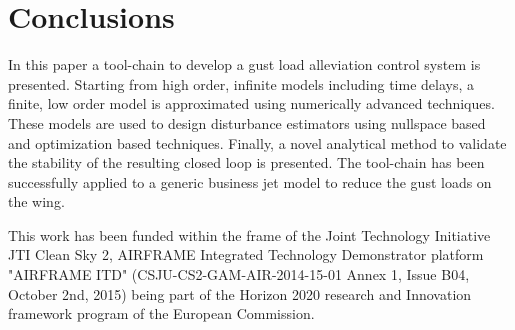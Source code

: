 \documentclass[graybox]{svmult}
\begin{document}
\section{Conclusions}
In this paper a tool-chain to develop a gust load alleviation control system is presented. Starting from high order, infinite models including time delays, a finite, low order model is approximated using numerically advanced techniques. These models are used to design  disturbance estimators using nullspace based and optimization based techniques. Finally, a novel analytical method to validate the stability of the resulting closed loop is presented. The tool-chain has been successfully applied to a generic business jet model to reduce the gust loads on the wing. 

\begin{acknowledgement}
This work has been funded within the frame of the Joint Technology Initiative JTI Clean Sky 2, AIRFRAME Integrated Technology Demonstrator platform "AIRFRAME ITD" (CSJU-CS2-GAM-AIR-2014-15-01 Annex 1, Issue B04, October 2nd, 2015) being part of the Horizon 2020 research and Innovation framework program of the European Commission.
\end{acknowledgement}
%




%
\end{document}
